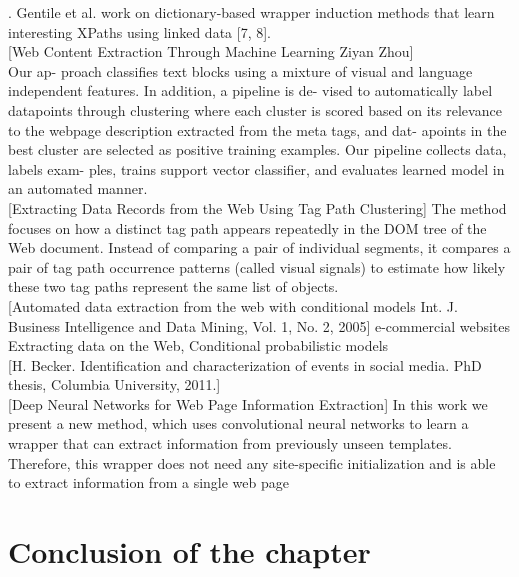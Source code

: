 . Gentile et al. work on dictionary-based wrapper
induction methods that learn interesting XPaths using linked
data [7, 8]. \cite{Gentile} \\

[Web Content Extraction Through Machine Learning Ziyan Zhou]\\
Our ap- proach classifies text blocks using a mixture of visual and language independent features. In addition, a pipeline is de- vised to automatically label datapoints through clustering where each cluster is scored based on its relevance to the webpage description extracted from the meta tags, and dat- apoints in the best cluster are selected as positive training examples. Our pipeline collects data, labels exam- ples, trains support vector classifier, and evaluates learned model in an automated manner.\\

\cite{TagPath} [Extracting Data Records from the Web Using Tag Path Clustering]
The method focuses on how a distinct tag path appears repeatedly in the DOM tree of the Web document. Instead of comparing a pair of individual segments, it compares a pair of tag path occurrence patterns (called visual signals) to estimate how likely these two tag paths represent the same list of objects.\\

\cite{CondModel} [Automated data extraction from the web with conditional models Int. J. Business Intelligence and Data Mining, Vol. 1, No. 2, 2005] e-commercial websites Extracting data on the Web, Conditional probabilistic models\\


\cite{becker}[H. Becker. Identification and characterization of events in social media. PhD thesis, Columbia University, 2011.]\\


\cite{Gogar2016} [Deep Neural Networks for Web Page Information Extraction] In this work we present a new method, which uses convolutional neural networks to learn a wrapper that can extract information from previously unseen templates. Therefore, this wrapper does not need any site-specific initialization and is able to extract information from a single web page\\ 




\section*{Conclusion of the chapter}